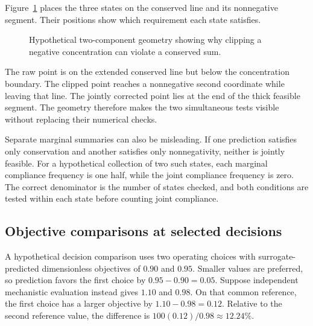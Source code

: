 Figure~\ref{fig:assessment_feasible_segment} places the three states on the conserved line and its nonnegative segment. Their positions show which requirement each state satisfies.

\begin{figure}[htbp]
\centering
{}
\caption{Hypothetical two-component geometry showing why clipping a negative concentration can violate a conserved sum.}
\label{fig:assessment_feasible_segment}
\end{figure}

The raw point is on the extended conserved line but below the concentration boundary. The clipped point reaches a nonnegative second coordinate while leaving that line. The jointly corrected point lies at the end of the thick feasible segment. The geometry therefore makes the two simultaneous tests visible without replacing their numerical checks.

Separate marginal summaries can also be misleading. If one prediction satisfies only conservation and another satisfies only nonnegativity, neither is jointly feasible. For a hypothetical collection of two such states, each marginal compliance frequency is one half, while the joint compliance frequency is zero. The correct denominator is the number of states checked, and both conditions are tested within each state before counting joint compliance.

\subsection{Objective comparisons at selected decisions}

A hypothetical decision comparison uses two operating choices with surrogate-predicted dimensionless objectives of $0.90$ and $0.95$. Smaller values are preferred, so prediction favors the first choice by $0.95-0.90=0.05$. Suppose independent mechanistic evaluation instead gives $1.10$ and $0.98$. On that common reference, the first choice has a larger objective by $1.10-0.98=0.12$. Relative to the second reference value, the difference is $100(0.12)/0.98\approx12.24\%$.

